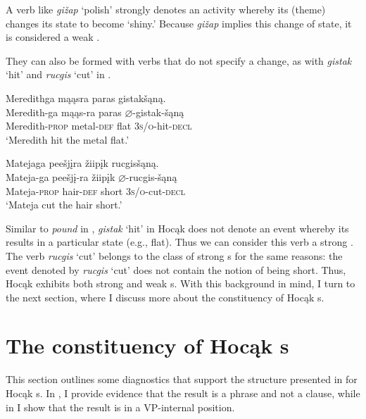 \documentclass[output=paper]{LSP/langsci}
\begin{document}
A verb like \textit{gižap} `polish' strongly denotes an activity whereby its  (theme) changes its state to become `shiny.' Because \textit{gižap} implies this change of state, it is considered a weak . 

They can also be formed with verbs that do not specify a change, as with \textit{gistak} `hit' and \textit{rucgis} `cut' in .

\begin{exe}
\ex\label{ex:rosen:13}
\begin{xlist}

\ex \glll Meredithga mąąsra paras gistakšąną. \\
 Meredith-ga mąąs-ra paras {$\varnothing$}-gistak-šąną\\
Meredith-\textsc{prop} metal-\textsc{def} flat \textsc{3s/o}-hit-\textsc{decl}\\
\glt `Meredith hit the metal flat.'

\ex \glll Matejaga peešjįra žiipįk rucgisšąną.\\
Mateja-ga peešjį-ra žiipįk {$\varnothing$}-rucgis-šąną\\
Mateja-\textsc{prop} hair-\textsc{def} short \textsc{3s/o}-cut-\textsc{decl}\\
\glt `Mateja cut the hair short.'

\end{xlist}
\end{exe}

Similar to \textit{pound} in , \textit{gistak} `hit' in Hocąk does not denote an event whereby its  results in a particular state (e.g., flat). Thus we can consider this verb a strong . The verb \textit{rucgis} `cut' belongs to the class of strong s for the same reasons: the event denoted by \textit{rucgis} `cut' does not contain the notion of being short. Thus, Hocąk exhibits both strong and weak s. With this background in mind, I turn to the next section, where I discuss more about the constituency of Hocąk s.

\section{The constituency of Hocąk s}\label{sec:rosen:3}

This section outlines some diagnostics that support the structure presented in  for Hocąk s. In , I provide evidence that the result is a phrase and not a clause, while in  I show that the result is in a VP-internal position.
\end{document}
